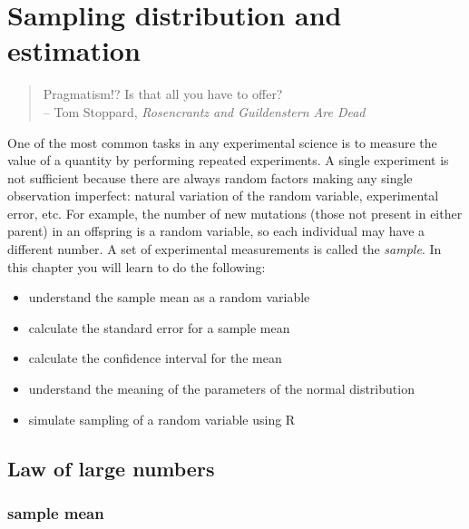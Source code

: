 \documentclass[
  letterpaper,
  DIV=11,
  numbers=noendperiod]{scrreprt}
\begin{document}

\hypertarget{sampling-distribution-and-estimation}{%
\chapter{Sampling distribution and
estimation}\label{sampling-distribution-and-estimation}}

\begin{quote}
Pragmatism!? Is that all you have to offer?\\
-- Tom Stoppard, \emph{Rosencrantz and Guildenstern Are Dead}
\end{quote}

One of the most common tasks in any experimental science is to measure
the value of a quantity by performing repeated experiments. A single
experiment is not sufficient because there are always random factors
making any single observation imperfect: natural variation of the random
variable, experimental error, etc. For example, the number of new
mutations (those not present in either parent) in an offspring is a
random variable, so each individual may have a different number. A set
of experimental measurements is called the \emph{sample}. In this
chapter you will learn to do the following:

\begin{itemize}
\item
  understand the sample mean as a random variable
\item
  calculate the standard error for a sample mean
\item
  calculate the confidence interval for the mean
\item
  understand the meaning of the parameters of the normal distribution
\item
  simulate sampling of a random variable using R
\end{itemize}

\hypertarget{law-of-large-numbers}{%
\section{Law of large numbers}\label{law-of-large-numbers}}

\label{sec:math5_1}

\hypertarget{sample-mean}{%
\subsection{sample mean}\label{sample-mean}}
\end{document}
